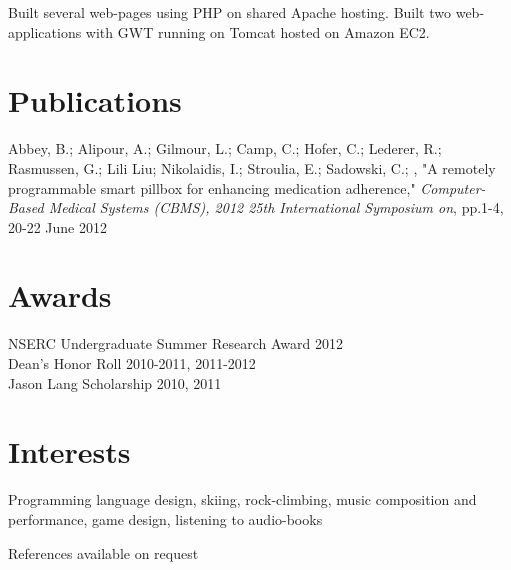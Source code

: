 \documentclass[10pt]{article}
\begin{document}
Built several web-pages using PHP on shared Apache hosting. Built two web-applications with GWT running on Tomcat hosted on Amazon EC2.

\section*{Publications}
Abbey, B.; Alipour, A.; Gilmour, L.; Camp, C.; Hofer, C.; Lederer, R.; Rasmussen, G.; Lili Liu; Nikolaidis, I.; Stroulia, E.; Sadowski, C.; , "A remotely programmable smart pillbox for enhancing medication adherence," \emph{Computer-Based Medical Systems (CBMS), 2012 25th International Symposium on}, pp.1-4, 20-22 June 2012

\section*{Awards}
\noindent NSERC Undergraduate Summer Research Award \hfill 2012 \\

\noindent Dean's Honor Roll \hfill 2010-2011, 2011-2012 \\

\noindent Jason Lang Scholarship \hfill 2010, 2011 \\



\section*{Interests}
Programming language design, skiing, rock-climbing, music composition and performance, game design, listening to audio-books\\

\vspace{\baselineskip}

\noindent References available on request
\end{document}
